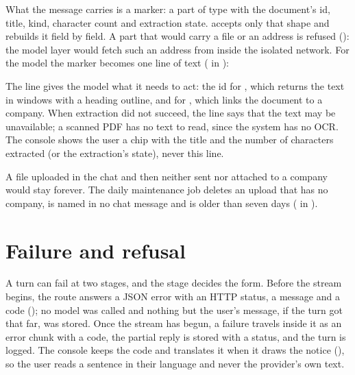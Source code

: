 What the message carries is a marker: a part of type  with the document's
id, title, kind, character count and extraction state.  accepts only that
shape and rebuilds it field by field. A part that would carry a file or an address is refused
(): the model layer would fetch such an address from inside the isolated
network. For the model the marker becomes one line of text ( in
):

\begin{codeblock}
\end{codeblock}

The line gives the model what it needs to act: the id for , which returns the text in windows with a
heading outline, and for , which links the document to a company. When
extraction did not succeed, the line says that the text may be unavailable; a scanned PDF has
no text to read, since the system has no OCR. The console shows the user a chip with the
title and the number of characters extracted (or the extraction's state), never this line.

A file uploaded in the chat and then neither sent nor attached to a company would stay
forever. The daily maintenance job deletes an upload that has no company, is named in no chat
message and is older than seven days ( in ).


\section{Failure and refusal}\label{sec:chat:failure}

A turn can fail at two stages, and the stage decides the form. Before the stream begins, the
route answers a JSON error with an HTTP status, a message and a code
(); no model was called and nothing but the user's message, if the
turn got that far, was stored. Once the stream has begun, a failure travels inside it as an
error chunk with a code, the partial reply is stored with a status, and the turn is logged.
The console keeps the code and translates it when it draws the notice
(), so the user reads a sentence in their language and never
the provider's own text.

